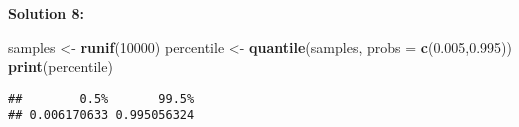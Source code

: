 \documentclass[]{article}
\newenvironment{Shaded}{\begin{snugshade}}{\end{snugshade}}
\newcommand{\DataTypeTok}[1]{\textcolor[rgb]{0.13,0.29,0.53}{#1}}
\newcommand{\DecValTok}[1]{\textcolor[rgb]{0.00,0.00,0.81}{#1}}
\newcommand{\FloatTok}[1]{\textcolor[rgb]{0.00,0.00,0.81}{#1}}
\newcommand{\KeywordTok}[1]{\textcolor[rgb]{0.13,0.29,0.53}{\textbf{#1}}}
\newcommand{\NormalTok}[1]{#1}
\newcommand{\StringTok}[1]{\textcolor[rgb]{0.31,0.60,0.02}{#1}}
\begin{document}
\textbf{Solution 8:}

\begin{Shaded}
\begin{Highlighting}[]
\NormalTok{samples <-}\StringTok{ }\KeywordTok{runif}\NormalTok{(}\DecValTok{10000}\NormalTok{)}
\NormalTok{percentile <-}\StringTok{ }\KeywordTok{quantile}\NormalTok{(samples, }\DataTypeTok{probs =} \KeywordTok{c}\NormalTok{(}\FloatTok{0.005}\NormalTok{,}\FloatTok{0.995}\NormalTok{))}
\KeywordTok{print}\NormalTok{(percentile)}
\end{Highlighting}
\end{Shaded}

\begin{verbatim}
##        0.5%       99.5% 
## 0.006170633 0.995056324
\end{verbatim}
\end{document}
